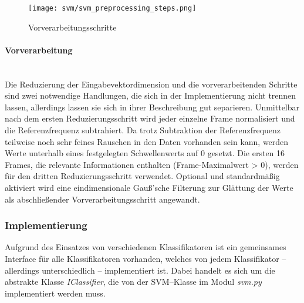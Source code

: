 \begin{figure*}[htbp] \centering
    \texttt{[image: svm/svm\_preprocessing\_steps.png]}
    \caption{Vorverarbeitungsschritte}
    \label{fig:svm_preprocessing_steps}
\end{figure*}

\paragraph{Vorverarbeitung}\label{sec:svm_preprocess}$\;$ \\\\
Die Reduzierung der Eingabevektordimension und die vorverarbeitenden Schritte sind zwei notwendige Handlungen, die sich in der Implementierung nicht trennen lassen, allerdings lassen sie sich in ihrer Beschreibung gut separieren.
Unmittelbar nach dem ersten Reduzierungsschritt wird jeder einzelne Frame normalisiert und die Referenzfrequenz subtrahiert.
Da trotz Subtraktion der Referenzfrequenz teilweise noch sehr feines Rauschen in den Daten vorhanden sein kann, werden Werte unterhalb eines festgelegten Schwellenwerts auf 0 gesetzt.
Die ersten 16 Frames, die relevante Informationen enthalten (Frame-Maximalwert > 0), werden für den dritten Reduzierungsschritt verwendet.
Optional und standardmäßig aktiviert wird eine eindimensionale Gauß'sche Filterung zur Glättung der Werte als abschließender Vorverarbeitungsschritt angewandt.

\subsubsection{Implementierung}
Aufgrund des Einsatzes von verschiedenen Klassifikatoren ist ein gemeinsames Interface für alle Klassifikatoren vorhanden, welches von jedem Klassifikator -- allerdings unterschiedlich -- implementiert ist. 
Dabei handelt es sich um die abstrakte Klasse \textit{IClassifier}, die von der \ac{SVM}--Klasse im Modul \textit{svm.py}  implementiert werden muss.

